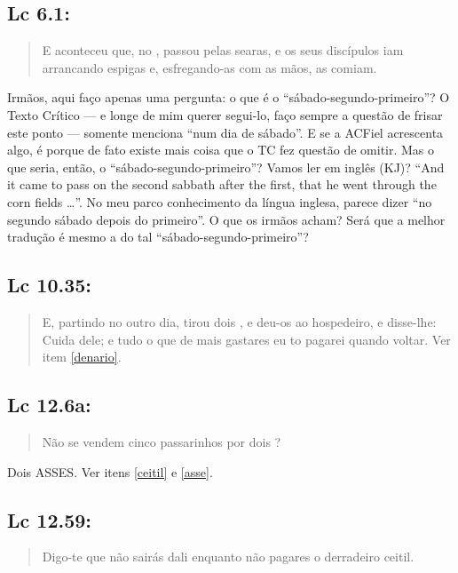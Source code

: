 \subsection*{Lc 6.1:}
\begin{quote}
    \small
E aconteceu que, no ,
passou pelas searas, e os seus discípulos iam arrancando espigas e,
esfregando-as com as mãos, as comiam.
\end{quote}

Irmãos, aqui faço apenas uma pergunta: o que é o ``sá\-ba\-do-se\-gun\-do-pri\-mei\-ro''? O Texto Crítico --- e longe de mim querer segui-lo, faço sempre a questão de frisar este ponto --- somente menciona ``num dia de sábado''. E se a ACFiel acrescenta algo, é porque de fato existe mais coisa que o TC fez questão de omitir. Mas o que seria, então, o ``sábado-segundo-primeiro''? Vamos ler em inglês
(KJ)? ``And it came to pass on the second sabbath after the first, that he went through the corn fields \ldots''. No meu parco conhecimento da língua inglesa, parece dizer ``no segundo sábado depois do primeiro''. O que os irmãos acham? Será que a melhor tradução é mesmo a do tal ``sábado-segundo-primeiro''?

\subsection*{Lc 10.35:}
\begin{quote}
    \small
E, partindo no outro dia, tirou dois , e deu-os ao hospedeiro, e disse-lhe: Cuida dele; e tudo o que de mais gastares eu to pagarei quando voltar.
Ver item \ref{denario}.
    \end{quote}

\subsection*{Lc 12.6a:}
\begin{quote}
    \small
Não se vendem cinco passarinhos por dois ?
\end{quote}

Dois ASSES. Ver itens \ref{ceitil} e \ref{asse}.

\subsection*{Lc 12.59:}
\begin{quote}
    \small
Digo-te que não sairás dali enquanto não pagares o derradeiro ceitil.
\end{quote}

